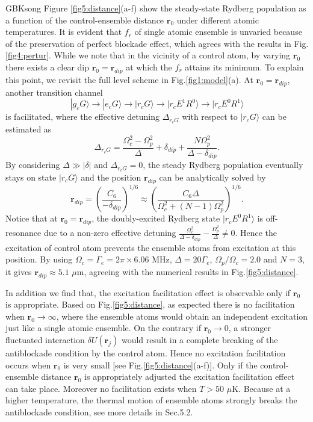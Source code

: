 \documentclass{cpbtex}
\begin{document}
\begin{CJK*}{GBK}{song}
 Figure \ref{fig5:distance}(a-f) show the steady-state Rydberg population as a function of the control-ensemble distance $\bm{r}_0$ under different atomic temperatures. It is evident that $f_r$ of single atomic ensemble is unvaried because of the preservation of perfect blockade effect, which agrees with the results in Fig.\ref{fig4:pertur}. While we note that in the vicinity of a control atom, by varying $\bm{r}_0$ there exists a clear dip $\bm{r}_0=\bm{r}_{dip}$ at which the $f_r$ attains its minimum. To explain this point, we revisit the full level scheme in Fig.\ref{fig1:model}(a). 
 At $\bm{r}_0=\bm{r}_{dip}$, another transition channel
 \begin{equation}
|g_cG\rangle\to|e_cG\rangle\to|r_cG\rangle\to|r_cE^1R^0\rangle\to|r_cE^0R^1\rangle
 \end{equation}
 is facilitated, where the effective detuning $\Delta_{r_cG}$ with respect to $|r_cG\rangle$ can be estimated as
\begin{equation}
    \Delta_{r_cG}=\frac{\Omega_c^2-\Omega_p^2}{\Delta}+\delta_{dip}+\frac{N\Omega_p^2}{\Delta-\delta_{dip}}.
\end{equation}
 By considering $\Delta\gg|\delta|$ and $\Delta_{r_cG}=0$, the steady Rydberg population eventually stays on state $|r_cG\rangle$ and the position $\bm{r}_{dip}$ can be analytically solved by
\begin{equation}
 \bm{r}_{dip}=(\frac{C_6}{-\delta_{dip}})^{1/6}\approx(\frac{C_6\Delta}{\Omega_c^2+(N-1)\Omega_p^2})^{1/6}.
 \label{deltadip2}
\end{equation}
 Notice that at $\bm{r}_0=\bm{r}_{dip}$, the doubly-excited Rydberg state $|r_cE^0R^1\rangle$ is off-resonance due to a non-zero effective detuning $\frac{\Omega_c^2}{\Delta-\delta_{dip}}-\frac{\Omega_p^2}{\Delta}\neq 0$. Hence the excitation of control atom prevents the ensemble atoms from excitation at this position. By using $\Omega_c=\Gamma_e=2\pi\times 6.06$ MHz, $\Delta=20\Gamma_e$, $\Omega_p/\Omega_c=2.0$ and $N=3$, it gives $\bm{r}_{dip}\approx 5.1$ $\mu$m, agreeing with the numerical results in Fig.\ref{fig5:distance}.

 In addition we find that, the excitation facilitation effect is observable only if $\bm{r}_0$ is appropriate. 
 Based on Fig.\ref{fig5:distance}, as expected there is no facilitation when $\bm{r}_0\to\infty$, where the ensemble atoms would obtain an independent excitation just like a single atomic ensemble. On the contrary if $\bm{r}_0\to 0$, a stronger fluctuated interaction $\delta U(\bm{r}_j)$ would result in a complete breaking of the 
 antiblockade condition by the control atom. Hence no excitation facilitation occurs when $\bm{r}_0$ is very small [see Fig.\ref{fig5:distance}(a-f)]. Only if the control-ensemble distance $\bm{r}_0$ is appropriately adjusted the excitation facilitation effect can take place.
  Moreover no facilitation exists when $T>50$ $\mu$K. Because at a higher temperature, the thermal motion of ensemble atoms strongly breaks the antiblockade condition, see more details in Sec.5.2.
 

\end{CJK*}
\end{document}
